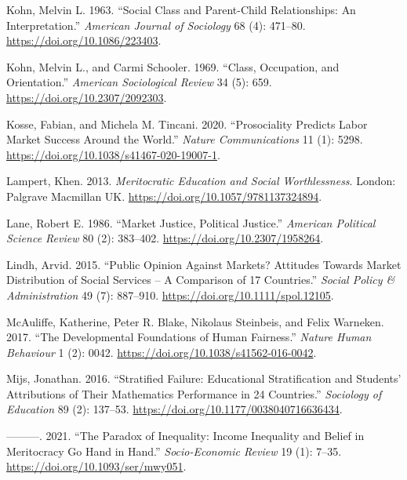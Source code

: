 \documentclass[
  letterpaper,
  DIV=11,
  numbers=noendperiod]{scrartcl}
\newlength{\cslhangindent}
\newlength{\cslentryspacingunit} %
\newenvironment{CSLReferences}[2] %
 {%
  \setlength{\parindent}{0pt}
  \ifodd #1
  \let\oldpar\par
  \def\par{\hangindent=\cslhangindent\oldpar}
  \fi
  \setlength{\parskip}{#2\cslentryspacingunit}
 }%
 {}
\begin{document}
\begin{CSLReferences}{1}{0}
\leavevmode{}%
Kohn, Melvin L. 1963. {``Social {Class} and {Parent-Child
Relationships}: {An Interpretation}.''} \emph{American Journal of
Sociology} 68 (4): 471--80. \url{https://doi.org/10.1086/223403}.

\leavevmode{}%
Kohn, Melvin L., and Carmi Schooler. 1969. {``Class, {Occupation}, and
{Orientation}.''} \emph{American Sociological Review} 34 (5): 659.
\url{https://doi.org/10.2307/2092303}.

\leavevmode{}%
Kosse, Fabian, and Michela M. Tincani. 2020. {``Prosociality Predicts
Labor Market Success Around the World.''} \emph{Nature Communications}
11 (1): 5298. \url{https://doi.org/10.1038/s41467-020-19007-1}.

\leavevmode{}%
Lampert, Khen. 2013. \emph{Meritocratic {Education} and {Social
Worthlessness}}. London: Palgrave Macmillan UK.
\url{https://doi.org/10.1057/9781137324894}.

\leavevmode{}%
Lane, Robert E. 1986. {``Market {Justice}, {Political Justice}.''}
\emph{American Political Science Review} 80 (2): 383--402.
\url{https://doi.org/10.2307/1958264}.

\leavevmode{}%
Lindh, Arvid. 2015. {``Public {Opinion} Against {Markets}? {Attitudes}
Towards {Market Distribution} of {Social Services} -- {A Comparison} of
17 {Countries}.''} \emph{Social Policy \& Administration} 49 (7):
887--910. \url{https://doi.org/10.1111/spol.12105}.

\leavevmode{}%
McAuliffe, Katherine, Peter R. Blake, Nikolaus Steinbeis, and Felix
Warneken. 2017. {``The Developmental Foundations of Human Fairness.''}
\emph{Nature Human Behaviour} 1 (2): 0042.
\url{https://doi.org/10.1038/s41562-016-0042}.

\leavevmode{}%
Mijs, Jonathan. 2016. {``Stratified {Failure}: {Educational
Stratification} and {Students}' {Attributions} of {Their Mathematics
Performance} in 24 {Countries}.''} \emph{Sociology of Education} 89 (2):
137--53. \url{https://doi.org/10.1177/0038040716636434}.

\leavevmode{}%
---------. 2021. {``The Paradox of Inequality: Income Inequality and
Belief in Meritocracy Go Hand in Hand.''} \emph{Socio-Economic Review}
19 (1): 7--35. \url{https://doi.org/10.1093/ser/mwy051}.


\end{CSLReferences}
\end{document}
